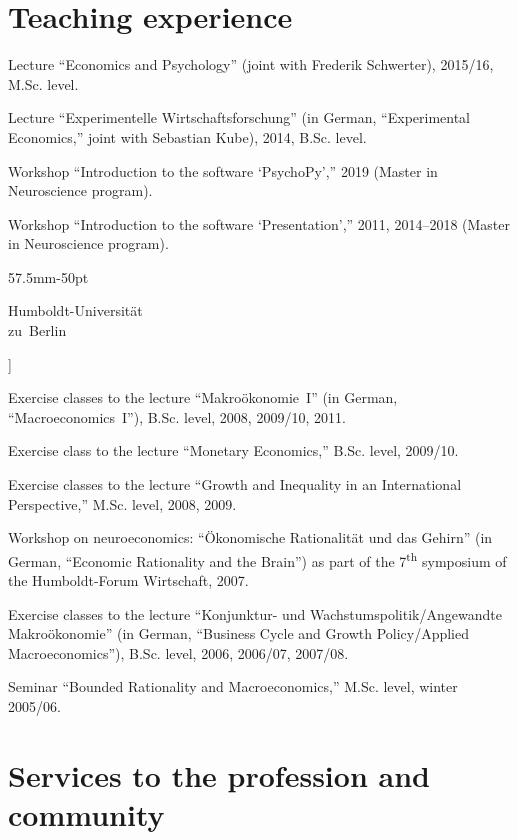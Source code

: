 \documentclass[11pt, a4paper, titleabove]{simplecv}
\renewcommand{\topicmargin}{57.5mm}
\newcommand{\multiline}[1]{%
	\parbox[t][10pt][t]{\topicmargin-50pt}{\RaggedLeft%
		#1%
		\normalsize\par%
	}%
}
\begin{document}
\section{Teaching experience}

\begin{topic}

	\item[University of Bonn]
	Lecture ``Economics and Psychology'' (joint with Frederik Schwer\-ter), 2015/16, M.Sc. level.
	\nopagebreak

	Lecture {``Experimentelle Wirtschaftsforschung''} (in German, ``Ex\-peri\-mental Economics,'' joint with Sebastian Kube), 2014, B.Sc. level.

	Workshop ``Introduction to the software `PsychoPy','' 2019 (Master in Neuroscience program).

	Workshop ``Introduction to the software `Presentation','' 2011, 2014--2018 (Master in Neuroscience program).

	\item[\multiline{Humboldt-Universität \\ zu~Berlin}]

	Exercise classes to the lecture {``Makroökonomie~I''} (in German, ``Macro\-economics~I''), B.Sc. level, 2008, 2009/10, 2011.

	Exercise class to the lecture ``Monetary Economics,'' B.Sc. level, 2009/10.

	Exercise classes to the lecture ``Growth and Inequality in an Inter\-national Perspective,'' M.Sc. level, 2008, 2009.

	Workshop on neuroeconomics: {``Ökonomische Rationalität und das Gehirn''} (in German, ``Economic Rationality and the Brain'') as part of the 7\textsuperscript{th} symposium of the {Humboldt-Forum Wirtschaft,} 2007.

	Exercise classes to the lecture {``Konjunktur- und Wachs\-tums\-politik/\hspace{0pt}Angewandte Makroökonomie''} (in German, ``Business Cycle and Growth Policy/\hspace{0pt}Applied Macroeconomics''), B.Sc. level, 2006, 2006/07, 2007/08.

	Seminar ``Bounded Rationality and Macroeconomics,'' M.Sc. level, winter 2005/06.

\end{topic}


\section{Services to the profession and community}
\end{document}

